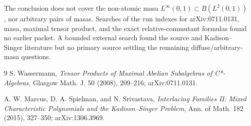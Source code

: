 \documentclass[11pt]{article}
\begin{document}
The conclusion does not cover the non-atomic masa
\(L^\infty(0,1)\subset B(L^2(0,1))\), nor arbitrary pairs of masas.  Searches
of the run indexes for arXiv:0711.0131, masa, maximal tensor product, and the
exact relative-commutant formulas found no earlier packet.  A bounded external
search found the source and Kadison--Singer literature but no primary source
settling the remaining diffuse/arbitrary-masa questions.

\begin{thebibliography}{9}
S. Wassermann,
\emph{Tensor Products of Maximal Abelian Subalgebras of C*-Algebras},
Glasgow Math. J. 50 (2008), 209--216; arXiv:0711.0131.

A. W. Marcus, D. A. Spielman, and N. Srivastava,
\emph{Interlacing Families II: Mixed Characteristic Polynomials and the
Kadison--Singer Problem},
Ann. of Math. 182 (2015), 327--350; arXiv:1306.3969.
\end{thebibliography}
\end{document}
